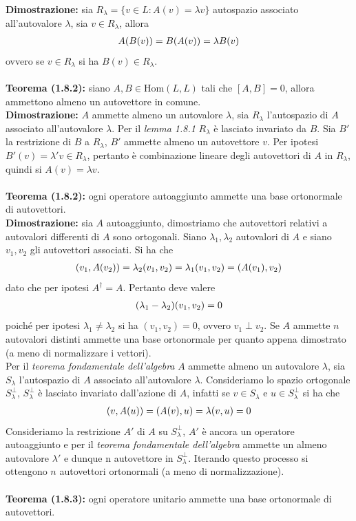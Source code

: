 \documentclass{article}
\begin{document}
\textbf{Dimostrazione:} sia $R_\lambda = \{v \in L : A(v) = \lambda v\}$ autospazio associato all'autovalore $\lambda$, sia $v \in R_\lambda$, allora
\begin{align}
    A(B(v)) = B(A(v)) = \lambda B(v) \notag
\end{align}
ovvero se $v \in R_\lambda$ si ha $B(v) \in R_\lambda$. \\ \\
\textbf{Teorema (1.8.2):} siano $A, B \in \mathrm{Hom}(L, L)$ tali che $[A, B] = 0$, allora ammettono almeno un autovettore in comune. \\

\textbf{Dimostrazione:} $A$ ammette almeno un autovalore $\lambda$, sia $R_\lambda$ l'autospazio di $A$ associato all'autovalore $\lambda$. Per il \textit{lemma 1.8.1} $R_\lambda$ è lasciato invariato da $B$. Sia $B'$ la restrizione di $B$ a $R_\lambda$, $B'$ ammette almeno un autovettore $v$. Per ipotesi $B'(v) = \lambda'v \in R_\lambda$, pertanto è combinazione lineare degli autovettori di $A$ in $R_\lambda$, quindi si $A(v) = \lambda v$. \\ \\
\textbf{Teorema (1.8.2):} ogni operatore autoaggiunto ammette una base ortonormale di autovettori. \\

\textbf{Dimostrazione:} sia $A$ autoaggiunto, dimostriamo che autovettori relativi a autovalori differenti di $A$ sono ortogonali. Siano $\lambda_1, \lambda_2$ autovalori di $A$ e siano $v_1, v_2$ gli autovettori associati. Si ha che
\begin{align}
    (v_1, A(v_2)) = \lambda_2(v_1, v_2) = \lambda_1(v_1, v_2) = (A(v_1), v_2) \notag
\end{align}
dato che per ipotesi $A^\dagger = A$. Pertanto deve valere
\begin{gather}
    (\lambda_1 - \lambda_2)(v_1, v_2) = 0 \notag
\end{gather}
poiché per ipotesi $\lambda_1 \neq \lambda_2$ si ha $(v_1, v_2) = 0$, ovvero $v_1 \perp v_2$. Se $A$ ammette $n$ autovalori distinti ammette una base ortonormale per quanto appena dimostrato (a meno di normalizzare i vettori). \\
Per il \textit{teorema fondamentale dell'algebra} $A$ ammette almeno un autovalore $\lambda$, sia $S_\lambda$ l'autospazio di $A$ associato all'autovalore $\lambda$. Consideriamo lo spazio ortogonale $S^\perp_\lambda$, $S^\perp_\lambda$ è lasciato invariato dall'azione di $A$, infatti se $v \in S_\lambda$ e $u \in S^\perp_\lambda$ si ha che
\begin{align}
    (v, A(u)) = (A(v), u) = \lambda(v, u) = 0 \notag
\end{align}
Consideriamo la restrizione $A'$ di $A$ su $S^\perp_\lambda$, $A'$ è ancora un operatore autoaggiunto e per il \textit{teorema fondamentale dell'algebra} ammette un almeno autovalore $\lambda'$ e dunque n autovettore in $S^\perp_\lambda$. Iterando questo processo si ottengono $n$ autovettori ortonormali (a meno di normalizzazione). \\ \\
\textbf{Teorema (1.8.3):} ogni operatore unitario ammette una base ortonormale di autovettori. \\
\end{document}
